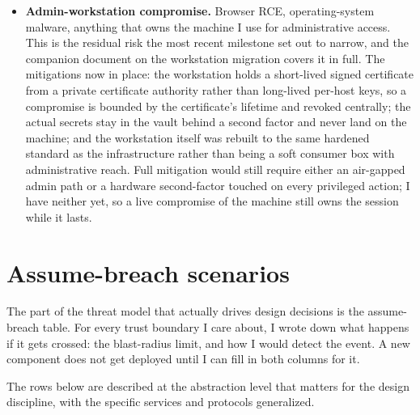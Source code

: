 \documentclass[12pt]{article}
\begin{document}
\begin{itemize}[leftmargin=18pt,itemsep=2pt]
  \item \textbf{Admin-workstation compromise.} Browser RCE, operating-system malware, anything that owns the machine I use for administrative access. This is the residual risk the most recent milestone set out to narrow, and the companion document on the workstation migration covers it in full. The mitigations now in place: the workstation holds a short-lived signed certificate from a private certificate authority rather than long-lived per-host keys, so a compromise is bounded by the certificate's lifetime and revoked centrally; the actual secrets stay in the vault behind a second factor and never land on the machine; and the workstation itself was rebuilt to the same hardened standard as the infrastructure rather than being a soft consumer box with administrative reach. Full mitigation would still require either an air-gapped admin path or a hardware second-factor touched on every privileged action; I have neither yet, so a live compromise of the machine still owns the session while it lasts.
\end{itemize}

\section{Assume-breach scenarios}

The part of the threat model that actually drives design decisions is the assume-breach table. For every trust boundary I care about, I wrote down what happens if it gets crossed: the blast-radius limit, and how I would detect the event. A new component does not get deployed until I can fill in both columns for it.

The rows below are described at the abstraction level that matters for the design discipline, with the specific services and protocols generalized.
\end{document}
